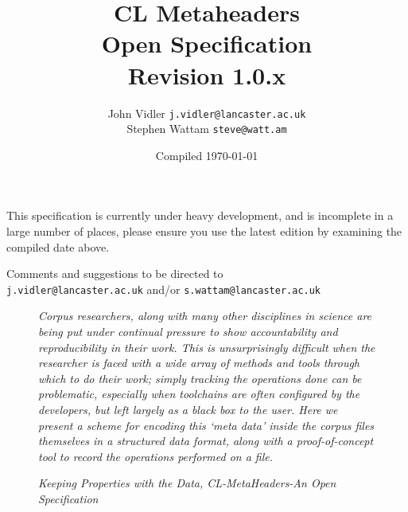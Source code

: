 \documentclass[10pt,a4paper,twoside,openany]{memoir}
\title{CL Metaheaders \\ Open Specification \\ Revision 1.0.x}
\author{
        John Vidler \texttt{j.vidler@lancaster.ac.uk} \\
        Stephen Wattam \texttt{steve@watt.am} \\
}
\date{Compiled \today}
\begin{document}
\maketitle

\begin{center}
\vspace*{3em}
This specification is currently under heavy development, and is incomplete in a large number of places, please ensure you use the latest edition by examining the compiled date above.

\vspace*{3em}

Comments and suggestions to be directed to\\
\texttt{j.vidler@lancaster.ac.uk} and/or \texttt{s.wattam@lancaster.ac.uk}
\end{center}

\begin{figure}[b!]
    \textit{Corpus researchers, along with many other disciplines in science are being put under continual pressure to show accountability and reproducibility in their work.
    This is unsurprisingly difficult when the researcher is faced with a wide array of methods and tools through which to do their work; simply tracking the operations done can be problematic, especially when toolchains are often configured by the developers, but left largely as a black box to the user.
    Here we present a scheme for encoding this `meta data' inside the corpus files themselves in a structured data format, along with a proof-of-concept tool to record the operations performed on a file.}
    
    \begin{flushright}
        \textit{Keeping Properties with the Data, CL-MetaHeaders-An Open Specification} \cite{vidler2017metaheaders}
    \end{flushright}
\end{figure}

\clearpage

\clearpage

\setcounter{page}{0}
\tableofcontents\clearpage

\clearpage
\clearpage
\clearpage
\clearpage
\clearpage
\clearpage



\end{document}
